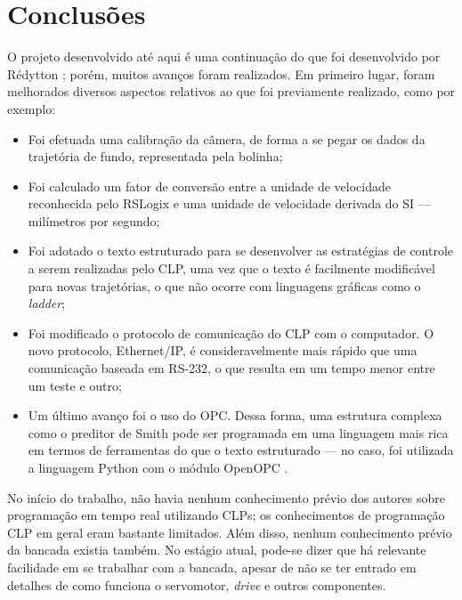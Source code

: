 


\chapter{Conclusões}

\label{CapConclusoes}

O projeto desenvolvido até aqui é uma continuação do que foi desenvolvido por Rédytton \cite{redytton}; porém, muitos avanços foram realizados. Em primeiro lugar, foram melhorados diversos aspectos relativos ao que foi previamente realizado, como por exemplo:
\begin{itemize}
\item Foi efetuada uma calibração da câmera, de forma a se pegar os dados da trajetória de fundo, representada pela bolinha;
\item Foi calculado um fator de conversão entre a unidade de velocidade reconhecida pelo RSLogix e uma unidade de velocidade derivada do SI --- milímetros por segundo;
\item Foi adotado o texto estruturado para se desenvolver as estratégias de controle a serem realizadas pelo CLP, uma vez que o texto é facilmente modificável para novas trajetórias, o que não ocorre com linguagens gráficas como o \textit{ladder};
\item Foi modificado o protocolo de comunicação do CLP com o computador. O novo protocolo, Ethernet/IP, é consideravelmente mais rápido que uma comunicação baseada em RS-232, o que resulta em um tempo menor entre um teste e outro;
\item Um último avanço foi o uso do OPC. Dessa forma, uma estrutura complexa como o preditor de Smith pode ser programada em uma linguagem mais rica em termos de ferramentas do que o texto estruturado --- no caso, foi utilizada a linguagem Python com o módulo OpenOPC \cite{OpenOPC}.
\end{itemize}

No início do trabalho, não havia nenhum conhecimento prévio dos autores sobre programação em tempo real utilizando CLPs; os conhecimentos de programação CLP em geral eram bastante limitados. Além disso, nenhum conhecimento prévio da bancada existia também. No estágio atual, pode-se dizer que há relevante facilidade em se trabalhar com a bancada, apesar de não se ter entrado em detalhes de como funciona o servomotor, \textit{drive} e outros componentes.

